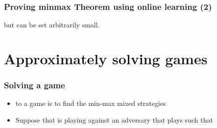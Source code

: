\documentclass[handout]{beamer}
\begin{document}
\begin{frame}
\frametitle{Proving minmax Theorem using online learning (2)}
\R{\em
\[
\begin{array}{rcll}
  &=&
\displaystyle{\frac{1}{T} \sumt \trans{\Pt}\M\Qt}
                       &\mbox{\rm by definition of~~\Qt}\nextline
\pause
  &\leq&
\displaystyle{\minp \frac{1}{T} \sumt \trans{\P}\M\Qt + \delt}
                       &\mbox{\rm by the Corollary} \nextline
\pause
  &=&
\displaystyle{\minp \trans{\P}\M\Qa + \delt}
                       &\mbox{\rm by definition of~~\Qa}\nextline
\pause
  &\leq&
\displaystyle{\maxq \minp \trans{\P}\M\Q + \delt.} &
\end{array}
\]
}
\pause
but \R{$\delt$} can be set arbitrarily small.

\end{frame}

\section{Approximately solving games}

\begin{frame}
  \frametitle{Solving a game}
  \begin{itemize}
    \item to  a game is to find the min-max mixed strategies
      \R{$\P,\Q$}
    \item Suppose that \ouralg is playing  against an
      adversary that plays  such that
  \end{itemize}
\end{frame}
\end{document}
